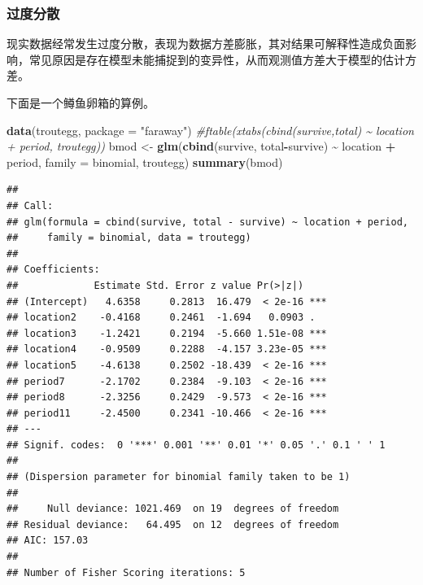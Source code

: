 \documentclass[
]{book}
\newenvironment{Shaded}{\begin{snugshade}}{\end{snugshade}}
\newcommand{\AttributeTok}[1]{\textcolor[rgb]{0.13,0.29,0.53}{#1}}
\newcommand{\CommentTok}[1]{\textcolor[rgb]{0.56,0.35,0.01}{\textit{#1}}}
\newcommand{\FunctionTok}[1]{\textcolor[rgb]{0.13,0.29,0.53}{\textbf{#1}}}
\newcommand{\NormalTok}[1]{#1}
\newcommand{\OtherTok}[1]{\textcolor[rgb]{0.56,0.35,0.01}{#1}}
\newcommand{\SpecialCharTok}[1]{\textcolor[rgb]{0.81,0.36,0.00}{\textbf{#1}}}
\newcommand{\StringTok}[1]{\textcolor[rgb]{0.31,0.60,0.02}{#1}}
\begin{document}
\subsubsection{过度分散}\label{ux8fc7ux5ea6ux5206ux6563}

现实数据经常发生过度分散，表现为数据方差膨胀，其对结果可解释性造成负面影响，常见原因是存在模型未能捕捉到的变异性，从而观测值方差大于模型的估计方差。

下面是一个鳟鱼卵箱的算例。

\begin{Shaded}
\begin{Highlighting}[]
\FunctionTok{data}\NormalTok{(troutegg, }\AttributeTok{package =} \StringTok{"faraway"}\NormalTok{)}
\CommentTok{\#ftable(xtabs(cbind(survive,total) \textasciitilde{} location + period, troutegg))}
\NormalTok{bmod }\OtherTok{\textless{}{-}} \FunctionTok{glm}\NormalTok{(}\FunctionTok{cbind}\NormalTok{(survive, total}\SpecialCharTok{{-}}\NormalTok{survive) }\SpecialCharTok{\textasciitilde{}}\NormalTok{ location }\SpecialCharTok{+}\NormalTok{ period,}
\AttributeTok{family =}\NormalTok{ binomial, troutegg)}
\FunctionTok{summary}\NormalTok{(bmod)}
\end{Highlighting}
\end{Shaded}

\begin{verbatim}
## 
## Call:
## glm(formula = cbind(survive, total - survive) ~ location + period, 
##     family = binomial, data = troutegg)
## 
## Coefficients:
##             Estimate Std. Error z value Pr(>|z|)    
## (Intercept)   4.6358     0.2813  16.479  < 2e-16 ***
## location2    -0.4168     0.2461  -1.694   0.0903 .  
## location3    -1.2421     0.2194  -5.660 1.51e-08 ***
## location4    -0.9509     0.2288  -4.157 3.23e-05 ***
## location5    -4.6138     0.2502 -18.439  < 2e-16 ***
## period7      -2.1702     0.2384  -9.103  < 2e-16 ***
## period8      -2.3256     0.2429  -9.573  < 2e-16 ***
## period11     -2.4500     0.2341 -10.466  < 2e-16 ***
## ---
## Signif. codes:  0 '***' 0.001 '**' 0.01 '*' 0.05 '.' 0.1 ' ' 1
## 
## (Dispersion parameter for binomial family taken to be 1)
## 
##     Null deviance: 1021.469  on 19  degrees of freedom
## Residual deviance:   64.495  on 12  degrees of freedom
## AIC: 157.03
## 
## Number of Fisher Scoring iterations: 5
\end{verbatim}
\end{document}
